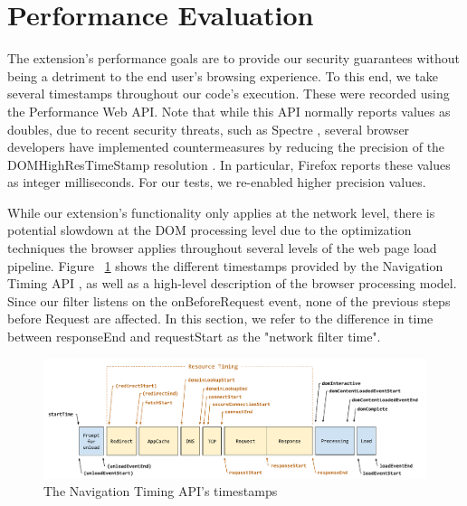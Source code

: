 \section{Performance Evaluation} \label{performance}
The extension's performance goals are to provide our security guarantees without being a detriment to the end user's browsing experience. To this end, we take several timestamps throughout our code's execution. These were recorded using the Performance Web API. Note that while this API normally reports values as doubles, due to recent security threats, such as Spectre \cite{DBLP:journals/corr/abs-1801-01203}, several browser developers have implemented countermeasures by reducing the precision of the DOMHighResTimeStamp resolution \cite{reducetimeprecision,resolutionconsiderations}. In particular, Firefox reports these values as integer milliseconds. For our tests, we re-enabled higher precision values.

While our extension's functionality only applies at the network level, there is potential slowdown at the DOM processing level due to the optimization techniques the browser applies throughout several levels of the web page load pipeline. Figure ~\ref{fig:navigationtiming} shows the different timestamps provided by the Navigation Timing API \cite{navigationtiming}, as well as a high-level description of the browser processing model. Since our filter listens on the onBeforeRequest event, none of the previous steps before Request are affected. In this section, we refer to the difference in time between responseEnd and requestStart as the "network filter time".

\begin{figure}[h]
 \includegraphics[scale=0.65]{img/timestamp-diagram.pdf}
 \caption{The Navigation Timing API's timestamps\protect\footnotemark}
 \label{fig:navigationtiming}
 \end{figure}


